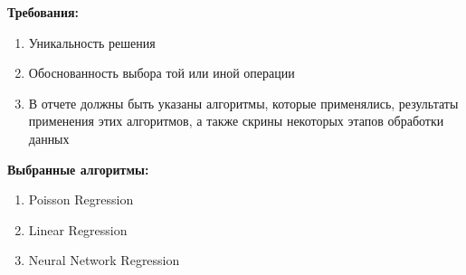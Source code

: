

{\bfseries Требования:}
\begin{enumerate}
    \item Уникальность решения
    \item Обоснованность выбора той или иной операции
    \item В отчете должны быть указаны алгоритмы, которые применялись, результаты применения этих алгоритмов, а также скрины некоторых этапов обработки данных
\end{enumerate}

{\bfseries Выбранные алгоритмы:}
\begin{enumerate}
    \item Poisson Regression
    \item Linear Regression
    \item Neural Network Regression
\end{enumerate}

\pagebreak